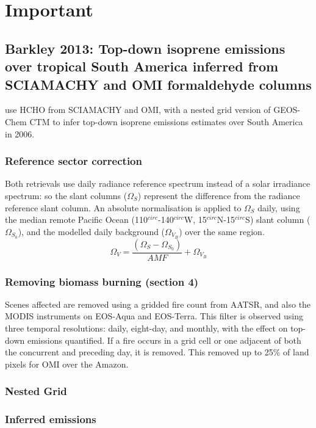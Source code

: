 \documentclass[11pt]{article} %
\begin{document}
\section{Important}
  \subsection{Barkley 2013: Top-down isoprene emissions over tropical South America inferred from SCIAMACHY and OMI formaldehyde columns}
    \citet{Barkley2013} use HCHO from SCIAMACHY and OMI, with a nested grid version of GEOS-Chem CTM to infer top-down isoprene emissions estimates over South America in 2006.
    
    \subsubsection{Reference sector correction}
      Both retrievals use daily radiance reference spectrum instead of a solar irradiance spectrum: so the slant columns ($\Omega_S$) represent the difference from the radiance reference slant column.
      An absolute normalisation is applied to $\Omega_S$ daily, using the median remote Pacific Ocean (110$^{circ}$-140$^{circ}$W, 15$^{circ}$N-15$^{circ}$S) slant column ($\Omega_{S_0}$), and the modelled daily background ($\Omega_{V_B}$) over the same region.
      \begin{equation*}
        \Omega_V = \frac{ \left( \Omega_S - \Omega_{S_0} \right) }{ AMF } + \Omega_{V_B}
      \end{equation*}
      
    
    \subsubsection{Removing biomass burning (section 4)}
      Scenes affected are removed using a gridded fire count from AATSR, and also the MODIS instruments on EOS-Aqua and EOS-Terra.
      This filter is observed using three temporal resolutions: daily, eight-day, and monthly, with the effect on top-down emissions quantified.
      If a fire occurs in a grid cell or one adjacent of both the concurrent and preceding day, it is removed.
      This removed up to 25\% of land pixels for OMI over the Amazon.
    
    \subsubsection{Nested Grid}
    
    \subsubsection{Inferred emissions}
    
\end{document}
